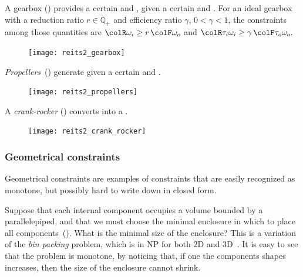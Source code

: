 \begin{example}
A gearbox () provides a certain  and , given a certain
 and . For
an ideal gearbox with a reduction ratio $r \in \mathbb{Q}_+$ and
efficiency ratio $\gamma$, $0<\gamma<1$, the constraints among
those quantities are ${\colR \omega_i}\geq r\,{\colF \omega_o}$
and ${\colR \tau_i\omega_i}\geq\gamma\,{\colF \tau_o\omega_o}.$
\end{example}


\begin{figure}[h]
    \centering
    \texttt{[image: reits2\_gearbox]}
    \caption{ \label{fig:gearbox}}
\end{figure}


\begin{example}
\emph{Propellers}~() generate 
given a certain  and .
\end{example}

\begin{figure}[h!]
    \centering
    \texttt{[image: reits2\_propellers]}
\caption{} \label{fig:propeller}
\end{figure}

\begin{example}
A \emph{crank-rocker} () converts  into a .
\end{example}

\begin{figure}[h!] 
    \centering
    \texttt{[image: reits2\_crank\_rocker]}
    \caption{
        \label{fig:crack}}
    \end{figure}

\subsubsection{Geometrical constraints}

Geometrical constraints are examples of constraints that are easily
recognized as monotone, but possibly hard to write down in closed
form.

\begin{example}
Suppose that each internal component occupies a volume
bounded by a parallelepiped, and that we must choose the minimal enclosure
in which to place all components~(). What
is the minimal size of the enclosure? This is a variation of the \emph{bin
packing} problem, which is in NP for both 2D and 3D~\cite{lodi02two}.
It is easy to see that the problem is monotone, by noticing that,
if one the components shapes increases, then the size of the enclosure
cannot shrink.
\end{example}

